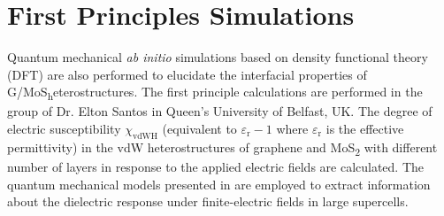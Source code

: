 \section{First Principles Simulations}
\label{sec:mult-theor-model}

Quantum mechanical \textit{ab initio} simulations based on
density functional theory (DFT) are also performed to elucidate the interfacial properties of G/MoS\textsubscript
heterostructures.
The first principle calculations are performed in the group of Dr. Elton Santos in Queen's University of Belfast, UK.
%
The degree of electric susceptibility $\chi_{\mathrm{vdWH}}$ (equivalent to
$\varepsilon_{\mathrm{r}} - 1$ where $\varepsilon_{\mathrm{r}}$ is the
effective permittivity) in the vdW heterostructures of graphene and
MoS\textsubscript{2} with different number of layers in response to
the applied electric fields are calculated.
%
The quantum mechanical models presented in
\cite{Santos_2013_tunable_eps_gr,Santos_2013_ACSnano_kaxi} are
employed to extract information about the dielectric response under
finite-electric fields in large supercells.
%


